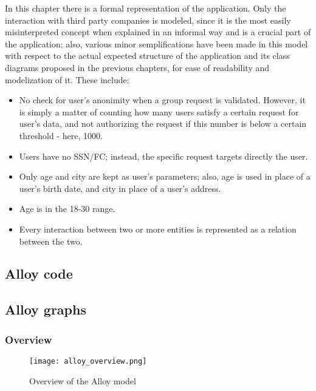\documentclass[../main.tex]{subfiles}
\begin{document}
In this chapter there is a formal representation of the application.
Only the interaction with third party companies is modeled, since it is the most easily misinterpreted concept when explained in an informal way and is a crucial part of the application; also, various minor semplifications have been made in this model with respect to the actual expected structure of the application and its class diagrams proposed in the previous chapters, for ease of readability and modelization of it. These include:

\begin{itemize}
	\item No check for user's anonimity when a group request is validated. However, it is simply a matter of counting how many users satisfy a certain request for user's data, and not authorizing the request if this number is below a certain threshold - here, 1000.
	\item Users have no SSN/FC; instead, the specific request targets directly the user.
	\item Only age and city are kept as user's parameters; also, age is used in place of a user's birth date, and city in place of a user's address.
	\item Age is in the 18-30 range.
	\item Every interaction between two or more entities is represented as a relation between the two.
\end{itemize}

\subsection{Alloy code}

\newpage

\subsection{Alloy graphs}

\subsubsection{Overview}

\begin{figure}[h!]
	\texttt{[image: alloy\_overview.png]}
	\caption{Overview of the Alloy model}
	\label{fig:alloy_overview}
\end{figure}
\end{document}
